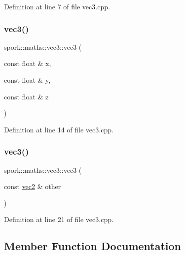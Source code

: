 Definition at line 7 of file vec3.\+cpp.

\mbox{\label{structspork_1_1maths_1_1vec3_aadbaef4db4a93f68a07c548582b973f0}} 
\subsubsection{\texorpdfstring{vec3()}{vec3()}\hspace{0.1cm}{\footnotesize\ttfamily [2/3]}}
{\footnotesize\ttfamily spork\+::maths\+::vec3\+::vec3 (\begin{DoxyParamCaption}\item[{const float \&}]{x,  }\item[{const float \&}]{y,  }\item[{const float \&}]{z }\end{DoxyParamCaption})}



Definition at line 14 of file vec3.\+cpp.

\mbox{\label{structspork_1_1maths_1_1vec3_a3b726e25a7ed93b65c272770b2c621b2}} 
\subsubsection{\texorpdfstring{vec3()}{vec3()}\hspace{0.1cm}{\footnotesize\ttfamily [3/3]}}
{\footnotesize\ttfamily spork\+::maths\+::vec3\+::vec3 (\begin{DoxyParamCaption}\item[{const \hyperlink{structspork_1_1maths_1_1vec2}{vec2} \&}]{other }\end{DoxyParamCaption})}



Definition at line 21 of file vec3.\+cpp.



\subsection{Member Function Documentation}
\mbox{\label{structspork_1_1maths_1_1vec3_ad498565117555b43d62cd6f94fcb7d79}} 
